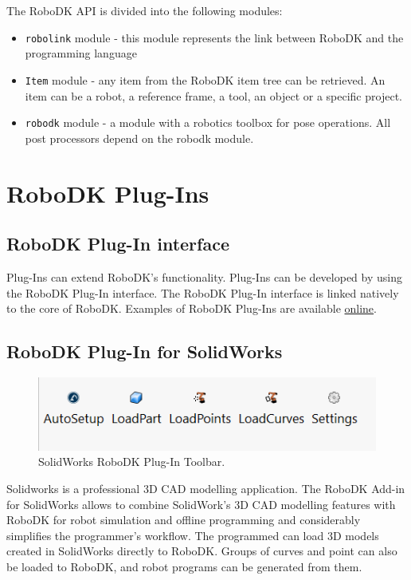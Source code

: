 The RoboDK API is divided into the following modules:


\begin{itemize}
    \item \texttt{robolink} module - this module represents the link between RoboDK and the programming language
    \item \texttt{Item} module - any item from the RoboDK item tree can be retrieved.  An item can be a robot, a reference frame, a tool, an object or a specific project.
    \item \texttt{robodk} module - a module with a robotics toolbox for pose operations. All post processors depend on the robodk module.
\end{itemize}

\section{RoboDK Plug-Ins}

\subsection{RoboDK Plug-In interface}

Plug-Ins can extend RoboDK's functionality. Plug-Ins can be developed by using the RoboDK Plug-In interface. The RoboDK Plug-In interface is linked natively to the core of RoboDK. Examples of RoboDK Plug-Ins are available \href{https://github.com/RoboDK/Plug-In-Interface}{online}. 

\subsection{RoboDK Plug-In for SolidWorks}

\begin{figure}[h]
    \centering
    \includegraphics[width=0.6\linewidth]{img/solidworks_toolbar.PNG}
    \caption{SolidWorks RoboDK Plug-In Toolbar.}
    \label{fig:solidworkstoolbar}
\end{figure}


Solidworks is a professional 3D CAD modelling application. The RoboDK Add-in for SolidWorks allows to combine SolidWork's 3D CAD modelling features with RoboDK for robot simulation and offline programming and considerably simplifies the programmer's workflow. The programmed can load 3D models created in SolidWorks directly to RoboDK. Groups of curves and point can also be loaded to RoboDK, and robot programs can be generated from them.

